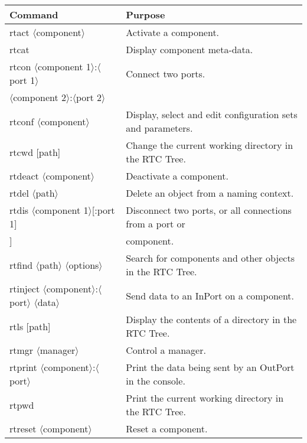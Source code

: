 \documentclass[a4paper,10pt]{article}
\newenvironment{Japanese}{%
  \CJKfamily{min}%
  \CJKtilde
  \CJKnospace}{}
\begin{document}

\begin{table}
  \centering
  \begin{tabularx}{\columnwidth}{ll}
    \toprule
    Command & Purpose \\
    \midrule
    rtact $\langle$component$\rangle$ & Activate a component. \\
    rtcat & Display component meta-data. \\
    rtcon $\langle$component 1$\rangle$:$\langle$port 1$\rangle$ & Connect two ports. \\
    \qquad$\langle$component 2$\rangle$:$\langle$port 2$\rangle$ & \\
    rtconf $\langle$component$\rangle$ & Display, select and edit configuration sets and parameters. \\
    rtcwd [path] & Change the current working directory in the RTC Tree. \\
    rtdeact $\langle$component$\rangle$ & Deactivate a component. \\
    rtdel $\langle$path$\rangle$ & Delete an object from a naming context. \\
    rtdis $\langle$component 1$\rangle$[:port 1] & Disconnect two ports, or all connections from a port or \\
    \qquad[component 2[:port 2]] & component. \\
    rtfind $\langle$path$\rangle$ $\langle$options$\rangle$ & Search for components and other objects in the RTC Tree. \\
    rtinject $\langle$component$\rangle$:$\langle$port$\rangle$ $\langle$data$\rangle$ & Send data to an InPort on a component. \\
    rtls [path] & Display the contents of a directory in the RTC Tree. \\
    rtmgr $\langle$manager$\rangle$ & Control a manager. \\
    rtprint $\langle$component$\rangle$:$\langle$port$\rangle$ & Print the data being sent by an OutPort in the console. \\
    rtpwd & Print the current working directory in the RTC Tree. \\
    rtreset $\langle$component$\rangle$ & Reset a component. \\
    \bottomrule
  \end{tabularx}
\end{table}
\end{document}
